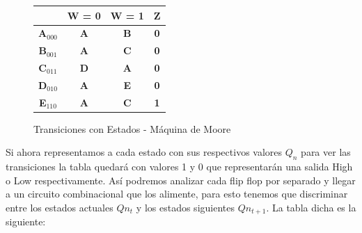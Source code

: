 \documentclass[10pt,a4paper]{article}
\begin{document}
\begin{figure}[H]
	\begin{center}
		\begin{tabular}{c|c|c|c|}
		\cline{2-4}
		\textbf{} & \textbf{W = 0} & \textbf{W = 1} & \textbf{Z} \\ \hline
		\multicolumn{1}{|c|}{\textbf{A$_{000}$}} & \textbf{A} & \textbf{B} & \textbf{0} \\ \hline
		\multicolumn{1}{|c|}{\textbf{B$_{001}$}} & \textbf{A} & \textbf{C} & \textbf{0} \\ \hline
		\multicolumn{1}{|c|}{\textbf{C$_{011}$}} & \textbf{D} & \textbf{A} & \textbf{0} \\ \hline
		\multicolumn{1}{|c|}{\textbf{D$_{010}$}} & \textbf{A} & \textbf{E} & \textbf{0} \\ \hline
		\multicolumn{1}{|c|}{\textbf{E$_{110}$}} & \textbf{A} & \textbf{C} & \textbf{1} \\ \hline
		\end{tabular}
	\caption{Transiciones con Estados - Máquina de Moore} 
	\label{2_fig1}
	\end{center}
\end{figure}
Si ahora representamos a cada estado con sus respectivos valores $Q_n$ para ver las transiciones la tabla quedar\'a con valores 1 y 0 que representar\'an una salida High o Low respectivamente. As\'i podremos analizar cada flip flop por separado y llegar a un circuito combinacional que los alimente, para esto tenemos que discriminar entre los estados actuales $Q{n_{t}}$ y los estados siguientes $Q{n_{t+1}}$. La tabla dicha es la siguiente:
\end{document}

